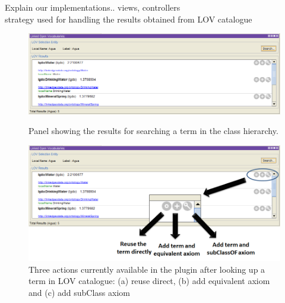 Explain our implementations.. views, controllers\\
strategy used for handling the results obtained from LOV catalogue

\begin{figure}[!bht]
\center
\includegraphics[scale=0.6]{img/LOVmockup.png}
\label{fig:LOVresults}
\caption{Panel showing the results for searching a term in the class hierarchy.}
\end{figure}


\begin{figure}[!bht]
\center
\includegraphics[scale=0.6]{img/LOVOptions.png}
\caption{Three actions currently available in the plugin after looking up a term in LOV catalogue: (a) reuse direct, (b) add equivalent axiom and (c) add subClass axiom}
\label{fig:LOVoptions}
\end{figure}
